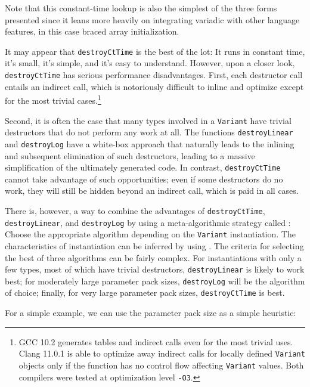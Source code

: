 \noindent Note that this constant-time lookup is also the simplest of the three
forms presented since it leans more heavily on integrating variadic
 with other language features, in this case
braced array initialization.

It may appear that \lstinline!destroyCtTime! is the best of the lot: It
runs in constant time, it's small, it's simple, and it's easy to
understand. However, upon a closer look, \lstinline!destroyCtTime! has
serious performance disadvantages. First, each destructor call entails
an indirect call, which is notoriously difficult to inline and optimize
except for the most trivial cases.{\cprotect\footnote{GCC 10.2 generates
tables and indirect calls even for the most trivial uses. Clang 11.0.1
is able to optimize away indirect calls for locally defined
\lstinline!Variant! objects only if the function has no control flow
affecting \lstinline!Variant! values. Both compilers were tested at
  optimization level \lstinline!-O3!.}}

Second, it is often the case that many types involved in a
\lstinline!Variant! have trivial destructors that do not perform any work
at all. The functions \lstinline!destroyLinear! and \lstinline!destroyLog!
have a white-box approach that naturally leads to the inlining and
subsequent elimination of such destructors, leading to a massive
simplification of the ultimately generated code. In contrast,
\lstinline!destroyCtTime! cannot take advantage of such opportunities; even
if some destructors do no work, they will still be hidden beyond an
indirect call, which is paid in all cases.

There is, however, a way to combine the advantages of
\lstinline!destroyCtTime!, \lstinline!destroyLinear!, and \lstinline!destroyLog!
by using a meta-algorithmic strategy called : Choose the appropriate algorithm depending on the
\lstinline!Variant! instantiation. The characteristics of instantiation can
be inferred by using . The criteria
for selecting the best of three algorithms can be fairly complex. For
instantiations with only a few types, most of which have trivial
destructors, \lstinline!destroyLinear! is likely to work best; for
moderately large parameter pack sizes, \lstinline!destroyLog! will be the
algorithm of choice; finally, for very large parameter pack sizes,
\lstinline!destroyCtTime! is best.

For a simple example, we can use the parameter pack size as a simple
heuristic:

